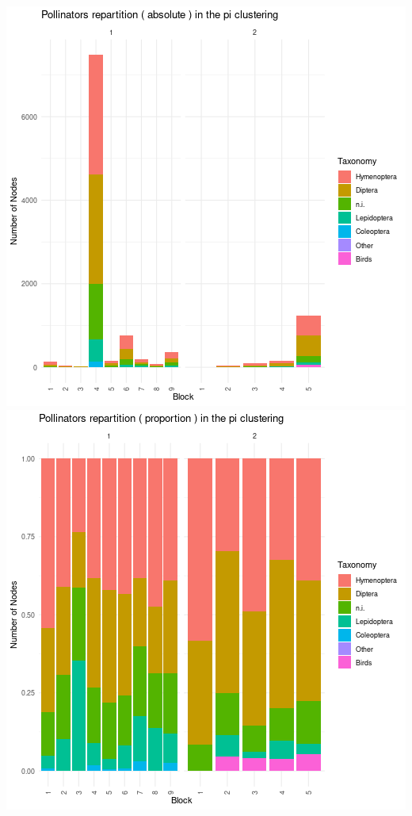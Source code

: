 \includegraphics{figure/pi_plot_taxonomy_pollinators-1.png}\includegraphics{figure/pi_plot_taxonomy_pollinators-2.png}

